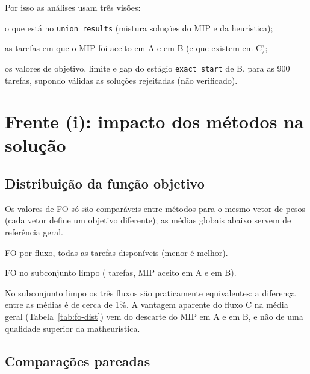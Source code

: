 \documentclass[11pt,a4paper]{article}
\begin{document}
Por isso as análises usam três visões:
\begin{description}[leftmargin=1.5em,style=nextline]
  \item[Reportado] o que está no \texttt{union\_results} (mistura soluções do MIP e da heurística);
  \item[Subconjunto limpo] as \nClean{} tarefas em que o MIP foi aceito em A e em B (e que existem em C);
  \item[Incumbente do MIP (B)] os valores de objetivo, limite e gap do estágio \texttt{exact\_start}
  de B, para as 900 tarefas, supondo válidas as soluções rejeitadas (não verificado).
\end{description}

\section{Frente (i): impacto dos métodos na solução}

\subsection{Distribuição da função objetivo}

Os valores de FO só são comparáveis entre métodos para o mesmo vetor de pesos
(cada vetor define um objetivo diferente); as médias globais abaixo servem de
referência geral.

\begin{table}[H]
  \centering
  \small
  
  \caption{FO por fluxo, todas as tarefas disponíveis (menor é melhor).}
  \label{tab:fo-dist}
\end{table}

\begin{table}[H]
  \centering
  \small
  
  \caption{FO no subconjunto limpo (\nClean{} tarefas, MIP aceito em A e em B).}
  \label{tab:fo-clean}
\end{table}

No subconjunto limpo os três fluxos são praticamente equivalentes: a diferença
entre as médias é de cerca de 1\%. A vantagem aparente do fluxo C na média geral
(Tabela~\ref{tab:fo-dist}) vem do descarte do MIP em A e em B, e não de uma
qualidade superior da matheurística.

\subsection{Comparações pareadas}
\end{document}
